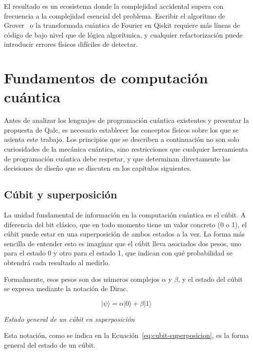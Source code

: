 El resultado es un ecosistema donde la complejidad accidental supera con frecuencia a la complejidad esencial del problema. Escribir el algoritmo de Grover~\cite{grover_1996} o la transformada cuántica de Fourier en Qiskit requiere más líneas de código de bajo nivel que de lógica algorítmica, y cualquier refactorización puede introducir errores físicos difíciles de detectar.

\section{Fundamentos de computación cuántica}
\label{sec:fundamentos}

Antes de analizar los lenguajes de programación cuántica existentes y presentar la propuesta de Qalc, es necesario establecer los conceptos físicos sobre los que se asienta este trabajo. Los principios que se describen a continuación no son solo curiosidades de la mecánica cuántica, sino restricciones que cualquier herramienta de programación cuántica debe respetar, y que determinan directamente las decisiones de diseño que se discuten en los capítulos siguientes.

\subsection{Cúbit y superposición}
\label{subsec:cubit}

La unidad fundamental de información en la computación cuántica es el cúbit. A diferencia del bit clásico, que en todo momento tiene un valor concreto (0 o 1), el cúbit puede estar en una superposición de ambos estados a la vez. La forma más sencilla de entender esto es imaginar que el cúbit lleva asociados dos pesos, uno para el estado 0 y otro para el estado 1, que indican con qué probabilidad se obtendrá cada resultado al medirlo.

Formalmente, esos pesos son dos números complejos $\alpha$ y $\beta$, y el estado del cúbit se expresa mediante la notación de Dirac.

\begin{equation}
\label{eq:cubit-superposicion}
|\psi\rangle = \alpha|0\rangle + \beta|1\rangle
\end{equation}
\begin{center}
\small\textit{Estado general de un cúbit en superposición}
\end{center}
Esta notación, como se indica en la Ecuación~\ref{eq:cubit-superposicion}, es la forma general del estado de un cúbit.

